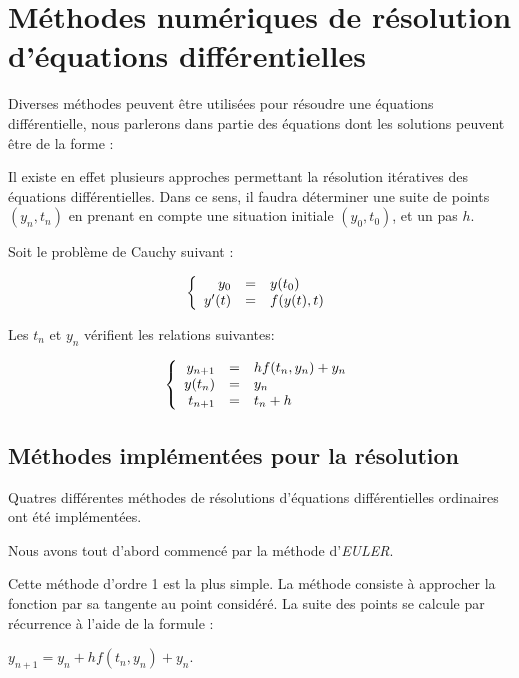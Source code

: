 \section{Méthodes numériques de résolution d'équations différentielles}


Diverses méthodes peuvent être utilisées pour résoudre une équations différentielle, nous parlerons dans partie des équations dont les solutions peuvent être de la forme : 
\begin{center}
\end{center}

Il existe en effet plusieurs approches permettant la résolution itératives des équations différentielles. Dans ce sens, il faudra déterminer une suite de points $(y_n, t_n)$ en prenant en compte une situation initiale $(y_0, t_0)$, et un pas $h$.


Soit le problème de Cauchy suivant : 

\[
   \left \{
   \begin{array}{r c l}
      y_0  & = & y(t_0) \\
      y'(t)  & = & f(y(t),t)\\
   \end{array}
   \right .
\]


Les $t_n$ et $y_n$ vérifient les relations suivantes:

\[
   \left \{
   \begin{array}{r c l}
      y_{n+1}  & = & hf(t_n, y_n) + y_n \\
      y(t_n)   & = & y_n \\
      t_{n+1} & = & t_n + h
   \end{array}
   \right .
\]


\subsection{Méthodes implémentées pour la résolution}


Quatres différentes méthodes de résolutions d'équations différentielles ordinaires ont été implémentées.



Nous avons tout d'abord commencé par la méthode d'\emph{EULER}.

Cette méthode d'ordre 1 est la plus simple. La méthode consiste à approcher la fonction par sa tangente au point considéré. La suite des points se calcule par récurrence à l'aide de la formule : 
\begin{center}
$y_{n+1}= y_n + hf(t_n, y_n)+ y_n$.
\end{center}


